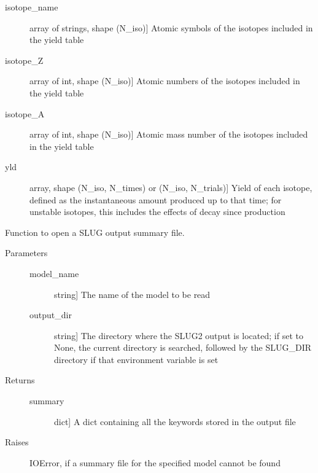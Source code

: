 \documentclass[letterpaper,10pt,english]{sphinxmanual}
\begin{document}
\begin{fulllineitems}
\begin{description}
\begin{description}
\item[{isotope\_name}] \leavevmode{[}array of strings, shape (N\_iso){]}
Atomic symbols of the isotopes included in the yield table

\item[{isotope\_Z}] \leavevmode{[}array of int, shape (N\_iso){]}
Atomic numbers of the isotopes included in the yield table

\item[{isotope\_A}] \leavevmode{[}array of int, shape (N\_iso){]}
Atomic mass number of the isotopes included in the yield table

\item[{yld}] \leavevmode{[}array, shape (N\_iso, N\_times) or (N\_iso, N\_trials){]}
Yield of each isotope, defined as the instantaneous amount
produced up to that time; for unstable isotopes, this
includes the effects of decay since production

\end{description}

\end{description}

\end{fulllineitems}


\begin{fulllineitems}
\label{slugpy:slugpy.read_summary}
Function to open a SLUG output summary file.
\begin{description}
\item[{Parameters}] \leavevmode\begin{description}
\item[{model\_name}] \leavevmode{[}string{]}
The name of the model to be read

\item[{output\_dir}] \leavevmode{[}string{]}
The directory where the SLUG2 output is located; if set to None,
the current directory is searched, followed by the SLUG\_DIR
directory if that environment variable is set

\end{description}

\item[{Returns}] \leavevmode\begin{description}
\item[{summary}] \leavevmode{[}dict{]}
A dict containing all the keywords stored in the output file

\end{description}

\item[{Raises}] \leavevmode
IOError, if a summary file for the specified model cannot be found

\end{description}

\end{fulllineitems}
\end{document}
